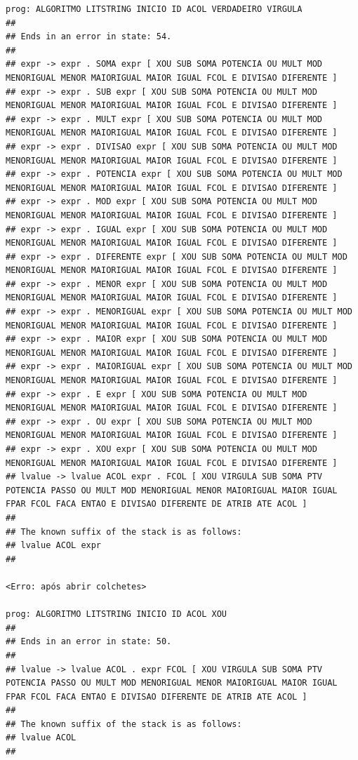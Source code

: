 \documentclass[hidelinks,12pt]{article}
\begin{document}
\begin{lstlisting}
prog: ALGORITMO LITSTRING INICIO ID ACOL VERDADEIRO VIRGULA 
##
## Ends in an error in state: 54.
##
## expr -> expr . SOMA expr [ XOU SUB SOMA POTENCIA OU MULT MOD MENORIGUAL MENOR MAIORIGUAL MAIOR IGUAL FCOL E DIVISAO DIFERENTE ]
## expr -> expr . SUB expr [ XOU SUB SOMA POTENCIA OU MULT MOD MENORIGUAL MENOR MAIORIGUAL MAIOR IGUAL FCOL E DIVISAO DIFERENTE ]
## expr -> expr . MULT expr [ XOU SUB SOMA POTENCIA OU MULT MOD MENORIGUAL MENOR MAIORIGUAL MAIOR IGUAL FCOL E DIVISAO DIFERENTE ]
## expr -> expr . DIVISAO expr [ XOU SUB SOMA POTENCIA OU MULT MOD MENORIGUAL MENOR MAIORIGUAL MAIOR IGUAL FCOL E DIVISAO DIFERENTE ]
## expr -> expr . POTENCIA expr [ XOU SUB SOMA POTENCIA OU MULT MOD MENORIGUAL MENOR MAIORIGUAL MAIOR IGUAL FCOL E DIVISAO DIFERENTE ]
## expr -> expr . MOD expr [ XOU SUB SOMA POTENCIA OU MULT MOD MENORIGUAL MENOR MAIORIGUAL MAIOR IGUAL FCOL E DIVISAO DIFERENTE ]
## expr -> expr . IGUAL expr [ XOU SUB SOMA POTENCIA OU MULT MOD MENORIGUAL MENOR MAIORIGUAL MAIOR IGUAL FCOL E DIVISAO DIFERENTE ]
## expr -> expr . DIFERENTE expr [ XOU SUB SOMA POTENCIA OU MULT MOD MENORIGUAL MENOR MAIORIGUAL MAIOR IGUAL FCOL E DIVISAO DIFERENTE ]
## expr -> expr . MENOR expr [ XOU SUB SOMA POTENCIA OU MULT MOD MENORIGUAL MENOR MAIORIGUAL MAIOR IGUAL FCOL E DIVISAO DIFERENTE ]
## expr -> expr . MENORIGUAL expr [ XOU SUB SOMA POTENCIA OU MULT MOD MENORIGUAL MENOR MAIORIGUAL MAIOR IGUAL FCOL E DIVISAO DIFERENTE ]
## expr -> expr . MAIOR expr [ XOU SUB SOMA POTENCIA OU MULT MOD MENORIGUAL MENOR MAIORIGUAL MAIOR IGUAL FCOL E DIVISAO DIFERENTE ]
## expr -> expr . MAIORIGUAL expr [ XOU SUB SOMA POTENCIA OU MULT MOD MENORIGUAL MENOR MAIORIGUAL MAIOR IGUAL FCOL E DIVISAO DIFERENTE ]
## expr -> expr . E expr [ XOU SUB SOMA POTENCIA OU MULT MOD MENORIGUAL MENOR MAIORIGUAL MAIOR IGUAL FCOL E DIVISAO DIFERENTE ]
## expr -> expr . OU expr [ XOU SUB SOMA POTENCIA OU MULT MOD MENORIGUAL MENOR MAIORIGUAL MAIOR IGUAL FCOL E DIVISAO DIFERENTE ]
## expr -> expr . XOU expr [ XOU SUB SOMA POTENCIA OU MULT MOD MENORIGUAL MENOR MAIORIGUAL MAIOR IGUAL FCOL E DIVISAO DIFERENTE ]
## lvalue -> lvalue ACOL expr . FCOL [ XOU VIRGULA SUB SOMA PTV POTENCIA PASSO OU MULT MOD MENORIGUAL MENOR MAIORIGUAL MAIOR IGUAL FPAR FCOL FACA ENTAO E DIVISAO DIFERENTE DE ATRIB ATE ACOL ]
##
## The known suffix of the stack is as follows:
## lvalue ACOL expr 
##

<Erro: após abrir colchetes>

prog: ALGORITMO LITSTRING INICIO ID ACOL XOU 
##
## Ends in an error in state: 50.
##
## lvalue -> lvalue ACOL . expr FCOL [ XOU VIRGULA SUB SOMA PTV POTENCIA PASSO OU MULT MOD MENORIGUAL MENOR MAIORIGUAL MAIOR IGUAL FPAR FCOL FACA ENTAO E DIVISAO DIFERENTE DE ATRIB ATE ACOL ]
##
## The known suffix of the stack is as follows:
## lvalue ACOL 
##


\end{lstlisting}
\end{document}
